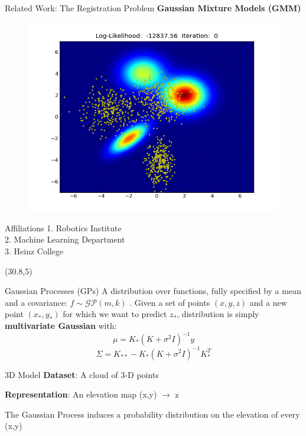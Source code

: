 \documentclass[final]{beamer}
\begin{document}
\begin{frame}{}
\begin{textblock}{27}
\begin{block}{Related Work: The Registration Problem}
{\bf Gaussian Mixture Models (GMM) \cite{jian_robust_5555}}
\begin{figure}
\includegraphics[width=10in]{register2D.png}
\end{figure}

\end{block}

\begin{block}{Affiliations}
1. Robotics Institute \\
2. Machine Learning Department \\
3. Heinz College
\end{block}
\end{textblock}

\begin{textblock}{27.5}(30.8,5)
\begin{block}{Gaussian Processes (GPs)}
A distribution over functions, fully specified by a mean and a covariance:
$f \sim \mathcal{GP}(m,k)$ \cite{rasmussen2006gaussian}. Given a set of points $(x,y,z)$ and a new point $(x_*,y_*)$ for which we want to predict $z_*$, 
distribution is simply {\bf multivariate Gaussian} with:
$$\mu = K_* (K + \sigma^2 I)^{-1}y$$
$$\Sigma = K_{**} - K_* (K + \sigma^2 I)^{-1} K_*^T$$
\end{block}

\begin{block}{3D Model}
{\bf Dataset}: A cloud of 3-D points

{\bf Representation}: An elevation map (x,y) $\rightarrow$ z

The Gaussian Process induces a probability distribution on the elevation of every (x,y)


\end{block}
\end{textblock}
\end{frame}
\end{document}
